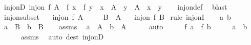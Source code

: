 \begin{isabellebody}
{\isafoldproof}%
%
\isadelimproof
\isanewline
%
\endisadelimproof
\isanewline
{}\isamarkupfalse%
\ inj{\isacharunderscore}{\kern0pt}onD{\isacharcolon}{\kern0pt}\ {\isachardoublequoteopen}inj{\isacharunderscore}{\kern0pt}on\ f\ A\ {\isasymLongrightarrow}\ f\ x\ {\isacharequal}{\kern0pt}\ f\ y\ {\isasymLongrightarrow}\ x\ {\isasymin}\ A\ {\isasymLongrightarrow}\ y\ {\isasymin}\ A\ {\isasymLongrightarrow}\ x\ {\isacharequal}{\kern0pt}\ y{\isachardoublequoteclose}\isanewline
%
\isadelimproof
\ \ %
\endisadelimproof
%
\isatagproof
{}\isamarkupfalse%
\ inj{\isacharunderscore}{\kern0pt}on{\isacharunderscore}{\kern0pt}def\ \isamarkupfalse%
\ blast%
\endisatagproof
{\isafoldproof}%
%
\isadelimproof
\isanewline
%
\endisadelimproof
\isanewline
{}\isamarkupfalse%
\ inj{\isacharunderscore}{\kern0pt}on{\isacharunderscore}{\kern0pt}subset{\isacharcolon}{\kern0pt}\isanewline
\ \ \ {\isachardoublequoteopen}inj{\isacharunderscore}{\kern0pt}on\ f\ A{\isachardoublequoteclose}\isanewline
\ \ \ \ \ {\isachardoublequoteopen}B\ {\isasymsubseteq}\ A{\isachardoublequoteclose}\isanewline
\ \ \ {\isachardoublequoteopen}inj{\isacharunderscore}{\kern0pt}on\ f\ B{\isachardoublequoteclose}\isanewline
%
\isadelimproof
%
\endisadelimproof
%
\isatagproof
{}\isamarkupfalse%
\ {\isacharparenleft}{\kern0pt}rule\ inj{\isacharunderscore}{\kern0pt}onI{\isacharparenright}{\kern0pt}\isanewline
\ \ \isamarkupfalse%
\ a\ b\isanewline
\ \ \isamarkupfalse%
\ {\isachardoublequoteopen}a\ {\isasymin}\ B{\isachardoublequoteclose}\ \ {\isachardoublequoteopen}b\ {\isasymin}\ B{\isachardoublequoteclose}\isanewline
\ \ \isamarkupfalse%
\ assms\ \isamarkupfalse%
\ {\isachardoublequoteopen}a\ {\isasymin}\ A{\isachardoublequoteclose}\ \ {\isachardoublequoteopen}b\ {\isasymin}\ A{\isachardoublequoteclose}\isanewline
\ \ \ \ \isamarkupfalse%
\ auto\isanewline
\ \ \isamarkupfalse%
\ \isamarkupfalse%
\ {\isachardoublequoteopen}f\ a\ {\isacharequal}{\kern0pt}\ f\ b{\isachardoublequoteclose}\isanewline
\ \ \isamarkupfalse%
\ \isamarkupfalse%
\ {\isachardoublequoteopen}a\ {\isacharequal}{\kern0pt}\ b{\isachardoublequoteclose}\isanewline
\ \ \ \ \isamarkupfalse%
\ assms\ \isamarkupfalse%
\ {\isacharparenleft}{\kern0pt}auto\ dest{\isacharcolon}{\kern0pt}\ inj{\isacharunderscore}{\kern0pt}onD{\isacharparenright}{\kern0pt}\isanewline

\end{isabellebody}
